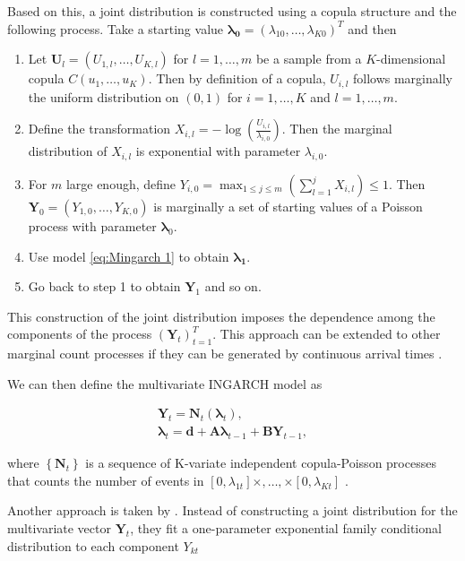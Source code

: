 Based on this, a joint distribution is constructed using a copula structure and the following process. Take a starting value $\bm{\lambda_0}=(\lambda_{10},\ldots,\lambda_{K0})^T$ and then \cite{Fokianos:2020}

\begin{enumerate}
	\item Let $\bm{U}_l=(U_{1,l},\ldots,U_{K,l})$ for $l=1,\ldots,m$ be a sample from a $K$-dimensional copula $C(u_1,\ldots,u_K)$. Then by definition of a copula, $U_{i,l}$ follows marginally the uniform distribution on $(0,1)$ for $i=1,\ldots,K$ and $l=1,\ldots,m$. 
	\item Define the transformation $X_{i,l} = -\log (\frac{U_{i,l}}{\lambda_{i,0}})$. Then the marginal distribution of $X_{i,l}$ is exponential with parameter $\lambda_{i,0}$. 
	\item For $m$ large enough, define $Y_{i,0} = \max_{1\leq j \leq m}(\sum_{l=1}^j X_{i,l})\leq 1$. Then $\bm{Y}_0=(Y_{1,0},\ldots,Y_{K,0})$ is marginally a set of starting values of a Poisson process with parameter $\bm{\lambda}_0$. 
	\item Use model \ref{eq:Mingarch 1} to obtain $\bm{\lambda_1}$.
	\item Go back to step 1 to obtain $\bm{Y}_1$ and so on. 
\end{enumerate}

This construction of the joint distribution imposes the dependence among the components of the process $(\bm{Y}_t)_{t=1}^T$. This approach can be extended to other marginal count processes if they can be generated by continuous arrival times \cite{Fokianos:2020}. 

We can then define the multivariate INGARCH model as

\begin{equation}
\begin{gathered}
\bm{Y}_t = \bm{N}_t(\bm{\lambda}_t), \\
\bm{\lambda}_t = \bm{d} + \bm{A}\bm{\lambda}_{t-1} + \bm{B}\bm{Y}_{t-1},
\label{eq:Mingarch 1 new}
\end{gathered}
\end{equation}

where $\left\{\bm{N}_t\right\}$ is a sequence of K-variate independent copula-Poisson processes that counts the number of events in $[0,\lambda_{1t}]\times,\ldots,\times[0,\lambda_{Kt}]$ \cite{Fokianos:2020}. 

Another approach is taken by \cite{Lee:2023}. Instead of constructing a joint distribution for the multivariate vector $\bm{Y}_t$, they fit a one-parameter exponential family conditional distribution to each component $Y_{kt}$

